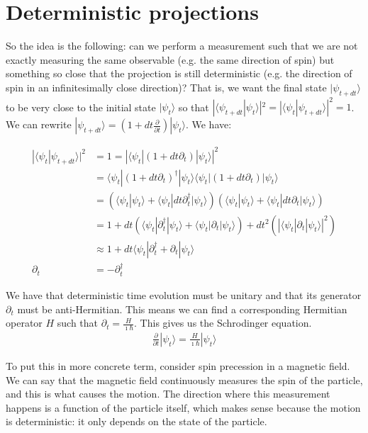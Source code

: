 \documentclass[aps,pra,10pt,floatfix,nofootinbib]{revtex4-1}
\theoremstyle{definition}
\begin{document}
\section{Deterministic projections}

So the idea is the following: can we perform a measurement such that we are not exactly measuring the same observable (e.g. the same direction of spin) but something so close that the projection is still deterministic (e.g. the direction of spin in an infinitesimally close direction)? That is, we want the final state $|\psi_{t+dt}\rangle$ to be very close to the initial state $|\psi_t\rangle$ so that $|\langle \psi_{t+dt}|\psi_t\rangle|^2=|\langle \psi_t|\psi_{t+dt}\rangle|^2=1$. We can rewrite $|\psi_{t+dt}\rangle = (1 + dt \frac{\partial}{\partial t}) |\psi_t\rangle $. We have:

\begin{align*}
|\langle \psi_t|\psi_{t+dt}\rangle|^2 &= 1 = |\langle \psi_t | (1 + dt \partial_t) |\psi_t\rangle|^2 \\
&= \langle \psi_t | (1 + dt \partial_t)^\dagger |\psi_t\rangle \langle \psi_t | (1 + dt \partial_t) |\psi_t\rangle \\
&= (\langle \psi_t | \psi_t\rangle + \langle \psi_t | dt \partial_t^\dagger |\psi_t\rangle ) (\langle \psi_t | \psi_t\rangle + \langle \psi_t | dt \partial_t |\psi_t\rangle ) \\
&= 1 + dt (\langle \psi_t | \partial_t^\dagger |\psi_t\rangle + \langle \psi_t | \partial_t |\psi_t\rangle) + dt^2 (|\langle \psi_t | \partial_t |\psi_t\rangle|^2) \\
&\approx 1 + dt \langle \psi_t | \partial_t^\dagger + \partial_t |\psi_t\rangle \\
\partial_t &= - \partial_t^\dagger 
\end{align*}

We have that deterministic time evolution must be unitary and that its generator $\partial_t$ must be anti-Hermitian. This means we can find a corresponding Hermitian operator $H$ such that $\partial_t = \frac{H}{\imath \hbar}$. This gives us the Schrodinger equation.
\begin{align*}
	\frac{\partial}{\partial t} | \psi_t \rangle = \frac{H}{\imath \hbar} |\psi_t\rangle
\end{align*}

To put this in more concrete term, consider spin precession in a magnetic field. We can say that the magnetic field continuously measures the spin of the particle, and this is what causes the motion. The direction where this measurement happens is a function of the particle itself, which makes sense because the motion is deterministic: it only depends on the state of the particle.
\end{document}
